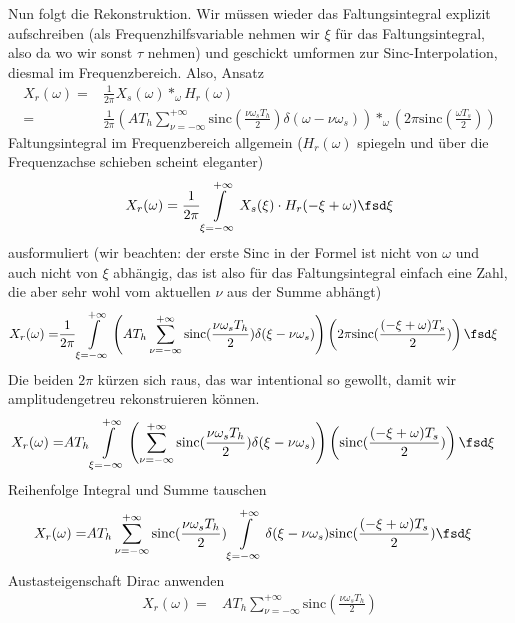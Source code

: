 \begin{Loesung}
Nun folgt die Rekonstruktion. Wir müssen wieder das Faltungsintegral explizit aufschreiben (als
Frequenzhilfsvariable nehmen wir $\xi$ für das Faltungsintegral, also da wo wir sonst $\tau$ nehmen)
und geschickt umformen zur Sinc-Interpolation, diesmal im Frequenzbereich.
%
Also, Ansatz
\begin{align}
X_r(\omega)
=& \frac{1}{2\pi} X_s(\omega) \ast_\omega H_r(\omega)\\
=& \frac{1}{2\pi} \left(A T_h \sum_{\nu=-\infty}^{+\infty} \mathrm{sinc}(\frac{\nu \omega_s T_h}{2}) \delta(\omega-\nu \omega_s)\right)
\ast_\omega \left(2\pi \mathrm{sinc}(\frac{\omega T_s}{2})\right)
\end{align}
%
Faltungsintegral im Frequenzbereich allgemein ($H_r(\omega)$ spiegeln und über
die Frequenzachse schieben scheint eleganter)
\begin{align}
X_r(\omega) = \frac{1}{2\pi}\int\limits_{\xi=-\infty}^{+\infty} X_s(\xi) \cdot H_r(-\xi + \omega) \fsd\xi
\end{align}
ausformuliert (wir beachten: der erste Sinc in der Formel ist nicht von $\omega$ und auch nicht von $\xi$ abhängig, das ist also für das Faltungsintegral einfach eine Zahl, die aber sehr wohl vom aktuellen $\nu$ aus der Summe abhängt)
\begin{align}
X_r(\omega)
=& \frac{1}{2\pi} \int\limits_{\xi=-\infty}^{+\infty}
\left(A T_h \sum_{\nu=-\infty}^{+\infty} \mathrm{sinc}(\frac{\nu \omega_s T_h}{2}) \delta(\xi-\nu \omega_s)\right)
\left(2\pi \mathrm{sinc}(\frac{(-\xi + \omega) T_s}{2})\right)
\fsd\xi
\end{align}
Die beiden $2\pi$ kürzen sich raus, das war intentional so gewollt, damit wir amplitudengetreu rekonstruieren können.
\begin{align}
X_r(\omega)
=& A T_h \int\limits_{\xi=-\infty}^{+\infty}
\left(\sum_{\nu=-\infty}^{+\infty} \mathrm{sinc}(\frac{\nu \omega_s T_h}{2}) \delta(\xi-\nu \omega_s)\right)
\left(\mathrm{sinc}(\frac{(-\xi + \omega) T_s}{2})\right)
\fsd\xi
\end{align}
Reihenfolge Integral und Summe tauschen
\begin{align}
X_r(\omega)
=& A T_h \sum_{\nu=-\infty}^{+\infty} \mathrm{sinc}(\frac{\nu \omega_s T_h}{2})
\int\limits_{\xi=-\infty}^{+\infty}
 \delta(\xi-\nu \omega_s)
\mathrm{sinc}(\frac{(-\xi + \omega) T_s}{2})
\fsd\xi
\end{align}
Austasteigenschaft Dirac anwenden
\begin{align}
X_r(\omega)
=& A T_h \sum_{\nu=-\infty}^{+\infty} \mathrm{sinc}(\frac{\nu \omega_s T_h}{2})

\end{align}
\end{Loesung}

